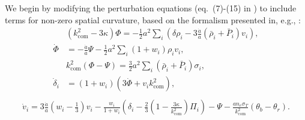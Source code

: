 We begin by modifying the perturbation equations (eq.~(7)-(15) in \citet{2022PhRvD.105h3515B}) to include terms for non-zero spatial curvature, based on the formalism presented in, e.g., \cite{1992PhR...215..203M}:
\begin{equation}\label{eq:coupled_eqns1}
\begin{aligned}
    &(k_{\mathrm{com}}^2-3\kappa)\Phi =-\frac{1}{2}a^2\sum_i (\delta\rho_i-3\frac{\dot a}{a}(\bar{\rho}_i+\bar{P}_i)v_i), \\ %
    \dot\Phi &=-\frac{\dot a}{a}\Psi-\frac{1}{2}a^2\sum_i(1+w_i)\rho_i v_i, \\ %
    &k_{\mathrm{com}}^2(\Phi-\Psi) =\frac{3}{2}a^2\sum_i (\bar{\rho}_i+\bar{P}_i)\sigma_i, \\ %
    \dot\delta_i &=(1+w_i)( 3\dot\Phi+v_i k_{\mathrm{com}}^2) , \\ %
\end{aligned}
\end{equation}
\begin{equation}\label{eq:coupled_eq2}
\begin{aligned} %
\dot v_i = 3\frac{\dot a}{a}(w_i-\frac{1}{3})v_i-\frac{w_i}{1+w_i}(\delta_i-\frac{2}{3}(1-\frac{3\kappa}{k_{\mathrm{com}}^2})\Pi_i)-\Psi-\frac{an_e\sigma_T}{k_{\mathrm{com}}^2}(\theta_b-\theta_r). %
\end{aligned}
\end{equation}
